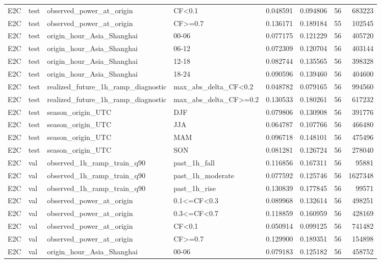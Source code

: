 \begin{tabular}{llllrrrr}
E2C & test & observed\_power\_at\_origin & CF<0.1 & 0.048591 & 0.094806 & 56 & 683223 \\
E2C & test & observed\_power\_at\_origin & CF>=0.7 & 0.136171 & 0.189184 & 55 & 102545 \\
E2C & test & origin\_hour\_Asia\_Shanghai & 00-06 & 0.077175 & 0.121229 & 56 & 405720 \\
E2C & test & origin\_hour\_Asia\_Shanghai & 06-12 & 0.072309 & 0.120704 & 56 & 403144 \\
E2C & test & origin\_hour\_Asia\_Shanghai & 12-18 & 0.082744 & 0.135565 & 56 & 398328 \\
E2C & test & origin\_hour\_Asia\_Shanghai & 18-24 & 0.090596 & 0.139460 & 56 & 404600 \\
E2C & test & realized\_future\_1h\_ramp\_diagnostic & max\_abs\_delta\_CF<0.2 & 0.048782 & 0.079165 & 56 & 994560 \\
E2C & test & realized\_future\_1h\_ramp\_diagnostic & max\_abs\_delta\_CF>=0.2 & 0.130533 & 0.180261 & 56 & 617232 \\
E2C & test & season\_origin\_UTC & DJF & 0.079806 & 0.130908 & 56 & 391776 \\
E2C & test & season\_origin\_UTC & JJA & 0.064787 & 0.107766 & 56 & 466480 \\
E2C & test & season\_origin\_UTC & MAM & 0.096718 & 0.148101 & 56 & 475496 \\
E2C & test & season\_origin\_UTC & SON & 0.081281 & 0.126724 & 56 & 278040 \\
E2C & val & observed\_1h\_ramp\_train\_q90 & past\_1h\_fall & 0.116856 & 0.167311 & 56 & 95881 \\
E2C & val & observed\_1h\_ramp\_train\_q90 & past\_1h\_moderate & 0.077592 & 0.125746 & 56 & 1627348 \\
E2C & val & observed\_1h\_ramp\_train\_q90 & past\_1h\_rise & 0.130839 & 0.177845 & 56 & 99571 \\
E2C & val & observed\_power\_at\_origin & 0.1<=CF<0.3 & 0.089968 & 0.132614 & 56 & 498251 \\
E2C & val & observed\_power\_at\_origin & 0.3<=CF<0.7 & 0.118859 & 0.160959 & 56 & 428169 \\
E2C & val & observed\_power\_at\_origin & CF<0.1 & 0.050914 & 0.099125 & 56 & 741482 \\
E2C & val & observed\_power\_at\_origin & CF>=0.7 & 0.129900 & 0.189351 & 56 & 154898 \\
E2C & val & origin\_hour\_Asia\_Shanghai & 00-06 & 0.079183 & 0.125182 & 56 & 458752 \\

\end{tabular}

